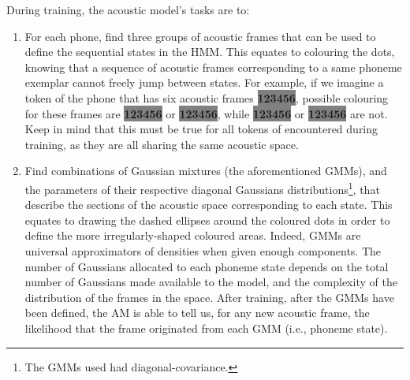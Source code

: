 During training, the acoustic model's tasks are to:
\begin{enumerate}
\item For each phone, find three groups of acoustic frames that can be used to define the sequential states in the HMM. This equates to colouring the dots, knowing that a sequence of acoustic frames corresponding to a same phoneme exemplar cannot freely jump between states. For example, if we imagine a token of the phone \textipa{[p]} that has six acoustic frames \colorbox{gray}{\textbf{123456}}, possible colouring for these frames are \colorbox{gray}{\textbf{{\color{yellow}123}{\color{blue}45}{\color{framboise}6}}} or \colorbox{gray}{\textbf{{\color{yellow}1}{\color{blue}23}{\color{framboise}456}}}, while \colorbox{gray}{\textbf{{\color{framboise}12}{\color{yellow}3}{\color{blue}45}{\color{yellow}6}}} or \colorbox{gray}{\textbf{{\color{yellow}1}{\color{blue}23}{\color{framboise}45}{\color{yellow}6}}} are not. Keep in mind that this must be true for all tokens of \textipa{[p]} encountered during training, as they are all sharing the same acoustic space.   
\item Find combinations of Gaussian mixtures (the aforementioned GMMs), and the parameters of their respective diagonal Gaussians distributions\footnote{The GMMs used had diagonal-covariance.}, that describe the sections of the acoustic space corresponding to each state. This equates to drawing the dashed ellipses around the coloured dots in order to define the more irregularly-shaped coloured areas. Indeed, GMMs are universal approximators of densities when given enough components. The number of Gaussians allocated to each phoneme state depends on the total number of Gaussians made available to the model, and the complexity of the distribution of the frames in the space. After training, after the GMMs have been defined, the AM is able to tell us, for any new acoustic frame, the likelihood that the frame originated from each GMM (i.e., phoneme state).
\end{enumerate}   

